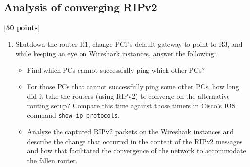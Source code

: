 \documentclass[pdftex,12pt,a4paper]{article}
\begin{document}
        \subsection{Analysis of converging RIPv2}
            \begin{flushright}
                \textbf{[50 points]}
            \end{flushright}

            \begin{enumerate}
                \item Shutdown the router R1, change PC1's default gateway to
                    point to R3, and while keeping an eye on
                    Wireshark instances, answer the following:
                    \begin{itemize}
                        \item Find which PCs cannot successfully ping which other PCs?
                        \item For those PCs that cannot successfully ping some
                            other PCs, how long did it take the routers (using
                            RIPv2) to converge on the alternative routing
                            setup? Compare this time against those timers in
                            Cisco's IOS command \texttt{show ip protocols}.
                        \item Analyze the captured RIPv2 packets on the
                            Wireshark instances and describe the change that
                            occurred in the content of the RIPv2 messages and
                            how that facilitated the convergence of the network
                            to accommodate the fallen router.
                    \end{itemize}
            \end{enumerate}
\end{document}
